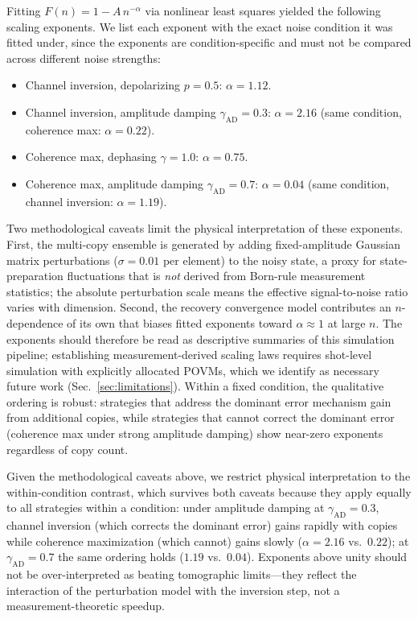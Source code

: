 \documentclass[a4paper,onecolumn]{quantumarticle}
\begin{document}
Fitting $F(n) = 1 - A\,n^{-\alpha}$ via nonlinear least squares yielded the following scaling exponents.
We list each exponent with the exact noise condition it was fitted under, since the exponents are condition-specific and must not be compared across different noise strengths:
\begin{itemize}
\item Channel inversion, depolarizing $p = 0.5$: $\alpha = 1.12$.
\item Channel inversion, amplitude damping $\gamma_\mathrm{AD} = 0.3$: $\alpha = 2.16$ (same condition, coherence max: $\alpha = 0.22$).
\item Coherence max, dephasing $\gamma = 1.0$: $\alpha = 0.75$.
\item Coherence max, amplitude damping $\gamma_\mathrm{AD} = 0.7$: $\alpha = 0.04$ (same condition, channel inversion: $\alpha = 1.19$).
\end{itemize}
Two methodological caveats limit the physical interpretation of these exponents.
First, the multi-copy ensemble is generated by adding fixed-amplitude Gaussian matrix perturbations ($\sigma = 0.01$ per element) to the noisy state, a proxy for state-preparation fluctuations that is \emph{not} derived from Born-rule measurement statistics; the absolute perturbation scale means the effective signal-to-noise ratio varies with dimension.
Second, the recovery convergence model contributes an $n$-dependence of its own that biases fitted exponents toward $\alpha \approx 1$ at large $n$.
The exponents should therefore be read as descriptive summaries of this simulation pipeline; establishing measurement-derived scaling laws requires shot-level simulation with explicitly allocated POVMs, which we identify as necessary future work (Sec.~\ref{sec:limitations}).
Within a fixed condition, the qualitative ordering is robust: strategies that address the dominant error mechanism gain from additional copies, while strategies that cannot correct the dominant error (coherence max under strong amplitude damping) show near-zero exponents regardless of copy count.

Given the methodological caveats above, we restrict physical interpretation to the within-condition contrast, which survives both caveats because they apply equally to all strategies within a condition: under amplitude damping at $\gamma_\mathrm{AD} = 0.3$, channel inversion (which corrects the dominant error) gains rapidly with copies while coherence maximization (which cannot) gains slowly ($\alpha = 2.16$ vs.\ $0.22$); at $\gamma_\mathrm{AD} = 0.7$ the same ordering holds ($1.19$ vs.\ $0.04$).
Exponents above unity should not be over-interpreted as beating tomographic limits---they reflect the interaction of the perturbation model with the inversion step, not a measurement-theoretic speedup.
\end{document}
